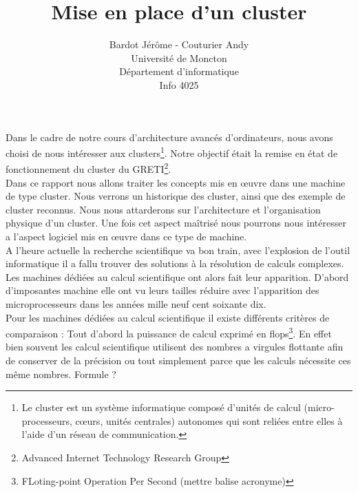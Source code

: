 \documentclass[12pt,a4paper,titlepage]{article}%
\title{\textbf{ Mise en place d'un cluster}}
\author{ Bardot Jérôme - Couturier Andy \\ Université de Moncton \\ Département d'informatique \\ Info 4025 }
\begin{document}
%



\pagestyle{fancy}


\fancyfoot[l]{\small \emph{}}
\fancyfoot[c]{\it \mancube \quad \thepage-\pageref{lastpage} \quad \mancube}
\fancyfoot[r]{\small \emph{}}


\maketitle 





Dans le cadre de notre cours d’architecture avancés d'ordinateurs, nous avons choisi de nous intéresser aux clusters\footnote{Le cluster est un système informatique composé d'unités de calcul (micro-processeurs, cœurs, unités centrales) autonomes qui sont reliées entre elles à l'aide d'un réseau de communication.}. Notre objectif était la remise en état de fonctionnement du cluster du GRETI\footnote{Advanced Internet Technology Research Group}.\\

Dans ce rapport nous allons traiter les concepts mis en œuvre dans une machine de type cluster. Nous verrons un historique des cluster, ainsi que des exemple de cluster reconnus. Nous nous attarderons sur l'architecture et l'organisation physique d'un cluster. Une fois cet aspect maîtrisé nous pourrons nous intéresser a l'aspect logiciel mis en œuvre dans ce type de machine.\\

A l'heure actuelle la recherche scientifique va bon train, avec l’explosion de l’outil informatique il a fallu trouver des solutions à la résolution de calculs complexes. Les machines dédiées au calcul scientifique ont alors fait leur apparition. D'abord d'imposantes machine elle ont vu leurs tailles
réduire avec l'apparition des microprocesseurs dans les années mille neuf cent soixante dix.\\

Pour les machines dédiées au calcul scientifique il existe différents critères de comparaison : 
Tout d'abord la puissance de calcul exprimé en flops\footnote{FLoting-point Operation Per Second (mettre balise acronyme)}. En effet bien souvent les calcul scientifique utilisent des nombres a virgules flottante afin de conserver de la précision ou tout simplement parce que les calculs nécessite ces même nombres.
Formule ?
\end{document}
